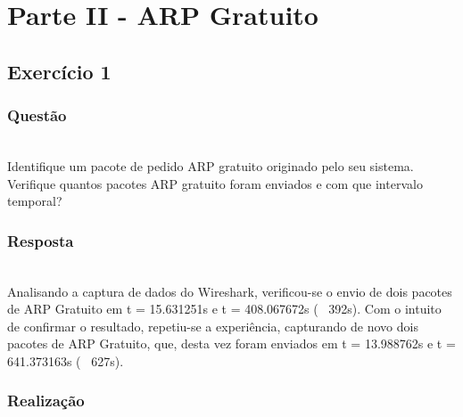 \documentclass{llncs}
\begin{document}
\clearpage
\section{Parte II - ARP Gratuito}

\subsection{Exercício 1}
\subsubsection{Questão}\rule[-10pt]{0pt}{10pt}\\

Identifique um pacote de pedido ARP gratuito originado pelo seu sistema. Verifique quantos pacotes ARP gratuito foram enviados e com que intervalo temporal?

\subsubsection{Resposta}\rule[-10pt]{0pt}{10pt}\\

Analisando a captura de dados do Wireshark, verificou-se o envio de dois pacotes de ARP Gratuito em t = 15.631251s e t = 408.067672s (~ 392s). Com o intuito de confirmar o resultado, repetiu-se a experiência, capturando de novo dois pacotes de ARP Gratuito, que, desta vez foram enviados em t = 13.988762s e t = 641.373163s (~ 627s).

\subsubsection{Realização}\rule[-10pt]{0pt}{10pt}\\
\end{document}

